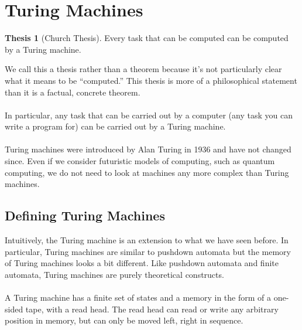 \documentclass[]{article}
\theoremstyle{definition}
\newtheorem*{thesis}{Thesis}
\newcommand{\lecture}[1]{\marginpar{{\footnotesize $\leftarrow$ \underline{#1}}}}
\begin{document}
  \section{Turing Machines} \lecture{November 12, 2013}
    \begin{thesis}[Church Thesis]
      Every task that can be computed can be computed by a Turing machine.
    \end{thesis}

    We call this a thesis rather than a theorem because it's not particularly clear what it means to be ``computed.'' This thesis is more of a philosophical statement than it is a factual, concrete theorem.
    \\ \\
    In particular, any task that can be carried out by a computer (any task you can write a program for) can be carried out by a Turing machine.
    \\ \\
    Turing machines were introduced by Alan Turing in 1936 and have not changed since. Even if we consider futuristic models of computing, such as quantum computing, we do not need to look at machines any more complex than Turing machines.

    \subsection{Defining Turing Machines}
      Intuitively, the Turing machine is an extension to what we have seen before. In particular, Turing machines are similar to pushdown automata but the memory of Turing machines looks a bit different. Like pushdown automata and finite automata, Turing machines are purely theoretical constructs.
      \\ \\
      A Turing machine has a finite set of states and a memory in the form of a one-sided tape, with a read head. The read head can read or write any arbitrary position in memory, but can only be moved left, right in sequence.
\end{document}
